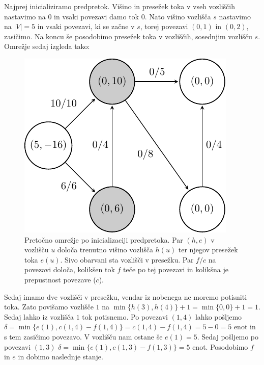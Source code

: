 \documentclass[mat1]{fmfdelo}
\begin{document}
Najprej inicializiramo predpretok. Višino in presežek toka v vseh vozliščih nastavimo na $0$ in vsaki povezavi
damo tok $0$. Nato višino vozlišča $s$ nastavimo na $|V| = 5$ in vsaki povezavi, ki se začne v $s$, torej
povezavi $(0,1)$ in $(0,2)$, zasičimo. Na koncu še posodobimo presežek toka v vozliščih, sosednjim vozlišču $s$.
Omrežje sedaj izgleda tako:

\begin{figure}[H]
  \centering
  \includegraphics{images/graf2-2.pdf}
  \caption{Pretočno omrežje po inicializaciji predpretoka. Par $(h, e)$ v vozlišču $u$ določa trenutno višino vozlišča $h(u)$ ter njegov presežek toka $e(u)$. Sivo obarvani sta vozlišči v presežku. Par $f/c$ na povezavi določa, kolikšen tok $f$ teče po tej povezavi in kolikšna je prepustnost povezave ($c$).}
\end{figure}

Sedaj imamo dve vozlišči v presežku, vendar iz nobenega ne moremo potisniti toka. Zato povišamo vozlišče $1$ na $\min \{h(3), h(4)\} + 1 = \min \{0, 0\} + 1 = 1$. Sedaj lahko iz vozlišča $1$ tok potisnemo.
Po povezavi $(1,4)$ lahko pošljemo $\delta = \min\{e(1), c(1,4) - f(1,4)\} = c(1,4) - f(1,4) = 5 - 0 = 5$ enot in s tem zasičimo povezavo. V vozlišču nam ostane še $e(1) = 5$. Sedaj pošljemo po povezavi
$(1,3)$ $\delta = \min \{e(1), c(1,3) - f(1,3)\} = 5$ enot. Posodobimo $f$ in $e$ in dobimo naslednje stanje.
\end{document}
